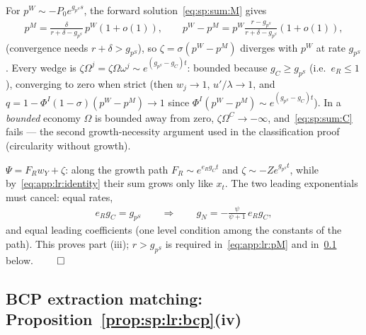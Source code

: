  For $p^W\sim-P_0e^{g_{p^S}s}$, the forward
solution~\eqref{eq:sp:sum:M} gives
\begin{align}
p^M=\frac{\delta}{r+\delta-g_{p^S}}\,p^W\left(1+o(1)\right),
\qquad
p^W-p^M=p^W\frac{r-g_{p^S}}{r+\delta-g_{p^S}}\left(1+o(1)\right),
\label{eq:app:lr:pM}
\end{align}
(convergence needs $r+\delta>g_{p^S}$), so $\zeta=\sigma\left(p^W-p^M\right)$ diverges with
$p^W$ at rate $g_{p^S}$. Every wedge is
$\zeta\Omega^j=\zeta\Omega\omega^j\sim e^{\left(g_{p^S}-g_C\right)t}$: bounded because
$g_C\ge g_{p^S}$ (i.e.\ $e_R\le1$), converging to zero when strict (then $w_j\to1$,
$u'/\lambda\to1$, and $q=1-\Phi^I\left(1-\sigma\right)\left(p^W-p^M\right)\to1$ since
$\Phi^I\left(p^W-p^M\right)\sim e^{\left(g_{p^S}-g_C\right)t}$). In a \emph{bounded} economy
$\Omega$ is bounded away from zero, $\zeta\Omega^C\to-\infty$, and~\eqref{eq:sp:sum:C} fails
--- the second growth-necessity argument used in the classification proof (circularity without
growth).

 $\Psi=F_Rw_Y+\zeta$: along the growth path $F_R\sim e^{e_Rg_Ct}$
and $\zeta\sim-Ze^{g_{p^S}t}$, while by~\eqref{eq:app:lr:identity} their sum grows only like
$x_t$. The two leading exponentials must cancel: equal rates,
\begin{align}
e_Rg_C=g_{p^S}
\qquad\Longrightarrow\qquad
g_N=-\frac{\psi}{\psi+1}\,e_Rg_C,
\label{eq:app:lr:gpin}
\end{align}
and equal leading coefficients (one level condition among the constants of the path). This
proves part (iii); $r>g_{p^S}$ is required in~\eqref{eq:app:lr:pM} and
in~\ref{sec:app:longrun:matching} below. \hfill$\qed$

\subsection{BCP extraction matching: Proposition~\ref{prop:sp:lr:bcp}(iv)}
\label{sec:app:longrun:matching}

